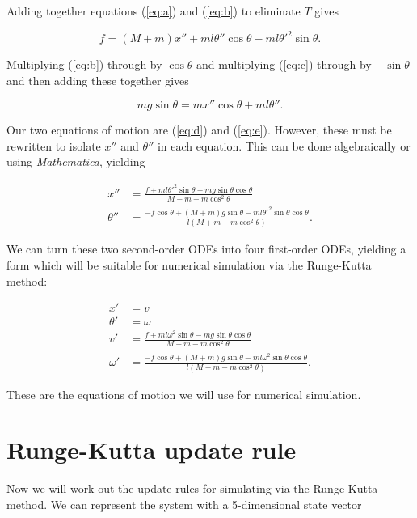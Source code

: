 \documentclass[12pt]{article}
\begin{document}
Adding together equations (\ref{eq:a}) and (\ref{eq:b}) to eliminate $T$ gives

\begin{equation}
\label{eq:d} f = (M + m) x'' + m l \theta'' \cos{\theta} - m l \theta'^2 \sin{\theta}.
\end{equation}

Multiplying (\ref{eq:b}) through by $\cos{\theta}$ and multiplying (\ref{eq:c}) through by $-\sin{\theta}$ and then adding these together gives

\begin{equation}
\label{eq:e} m g \sin{\theta} = m x'' \cos{\theta} + m l \theta''.
\end{equation}

Our two equations of motion are (\ref{eq:d}) and (\ref{eq:e}). However, these must be rewritten to isolate $x''$ and $\theta''$ in each equation. This can be done algebraically or using \textit{Mathematica}, yielding

\begin{align}
x'' &= \frac{f + m l \theta'^2 \sin{\theta} - m g \sin{\theta} \cos{\theta}}{M - m - m \cos^2{\theta}} \\[5pt]
\theta'' &= \frac{-f \cos{\theta} + (M + m) g \sin{\theta} - m l \theta'^2 \sin{\theta} \cos{\theta}}{l (M + m - m \cos^2{\theta})}.
\end{align}

We can turn these two second-order ODEs into four first-order ODEs, yielding a form which will be suitable for numerical simulation via the Runge-Kutta method:

\begin{align}
x' &= v \\[5pt]
\theta' &= \omega \\[5pt]
v' &= \frac{f + m l \omega^2 \sin{\theta} - m g \sin{\theta} \cos{\theta}}{M + m - m \cos^2{\theta}} \\[5pt]
\omega' &= \frac{-f \cos{\theta} + (M + m) g \sin{\theta} - m l \omega^2 \sin{\theta} \cos{\theta}}{l (M + m - m \cos^2{\theta})}.
\end{align}

These are the equations of motion we will use for numerical simulation.

\section{Runge-Kutta update rule}
Now we will work out the update rules for simulating via the Runge-Kutta method. We can represent the system with a 5-dimensional state vector
\end{document}
